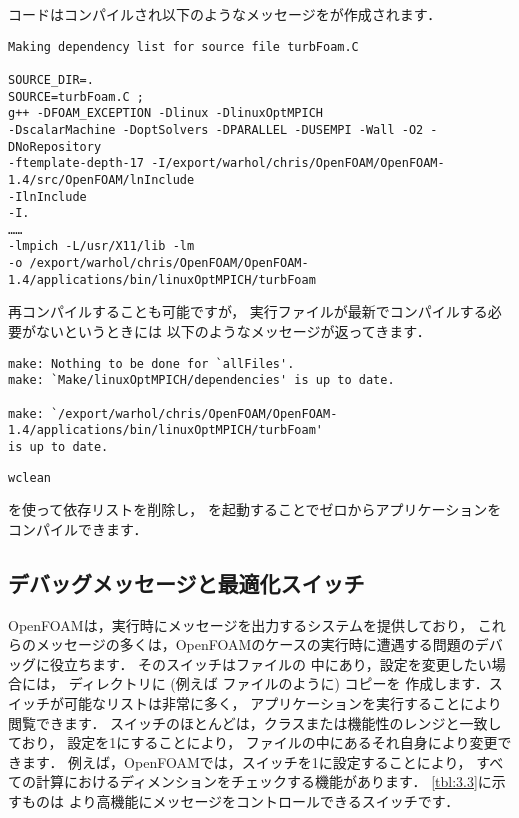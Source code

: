 コードはコンパイルされ以下のようなメッセージをが作成されます．
\begin{OFterminal}
\begin{verbatim}
Making dependency list for source file turbFoam.C

SOURCE_DIR=.
SOURCE=turbFoam.C ;
g++ -DFOAM_EXCEPTION -Dlinux -DlinuxOptMPICH
-DscalarMachine -DoptSolvers -DPARALLEL -DUSEMPI -Wall -O2 -DNoRepository
-ftemplate-depth-17 -I/export/warhol/chris/OpenFOAM/OpenFOAM-1.4/src/OpenFOAM/lnInclude
-IlnInclude
-I.
……
-lmpich -L/usr/X11/lib -lm
-o /export/warhol/chris/OpenFOAM/OpenFOAM-1.4/applications/bin/linuxOptMPICH/turbFoam
\end{verbatim}
\end{OFterminal}
再コンパイルすることも可能ですが，
実行ファイルが最新でコンパイルする必要がないというときには
以下のようなメッセージが返ってきます．
\begin{OFterminal}
\begin{verbatim}
make: Nothing to be done for `allFiles'.
make: `Make/linuxOptMPICH/dependencies' is up to date.

make: `/export/warhol/chris/OpenFOAM/OpenFOAM-1.4/applications/bin/linuxOptMPICH/turbFoam'
is up to date.
\end{verbatim}
\end{OFterminal}

\begin{OFterminal}
\begin{verbatim}
wclean
\end{verbatim}
\end{OFterminal}
を使って依存リストを削除し，
を起動することでゼロからアプリケーションをコンパイルできます．


\subsection{デバッグメッセージと最適化スイッチ}
\label{ssec:3.2.5}
OpenFOAMは，実行時にメッセージを出力するシステムを提供しており，
これらのメッセージの多くは，OpenFOAMのケースの実行時に遭遇する問題のデバッグに役立ちます．
そのスイッチはファイルの
中にあり，設定を変更したい場合には，
ディレクトリに (例えば
ファイルのように) コピーを
作成します．スイッチが可能なリストは非常に多く，
アプリケーションを実行することにより閲覧できます．
スイッチのほとんどは，クラスまたは機能性のレンジと一致しており，
設定を1にすることにより，
ファイルの中にあるそれ自身により変更できます．
例えば，OpenFOAMでは，スイッチを1に設定することにより，
すべての計算におけるディメンションをチェックする機能があります．
\autoref{tbl:3.3}に示すものは
より高機能にメッセージをコントロールできるスイッチです．

